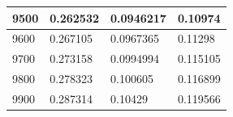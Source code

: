 \documentclass[11pt,spanish]{article} %
\begin{document}
\begin{center}
\begin{longtable}{|l||l|l|l|}
9500                    & 0.262532                     & 0.0946217                      & 0.10974                        \\ \hline
9600                    & 0.267105                     & 0.0967365                      & 0.11298                        \\ \hline
9700                    & 0.273158                     & 0.0994994                      & 0.115105                       \\ \hline
9800                    & 0.278323                     & 0.100605                       & 0.116899                       \\ \hline
9900                    & 0.287314                     & 0.10429                        & 0.119566                       \\ \hline
	\end{longtable}
	\end{center}
	
	
\end{document}
